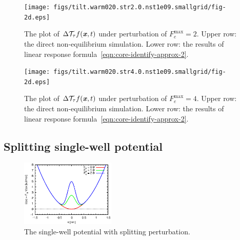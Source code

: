 \documentclass[aip,jcp,a4paper,reprint,onecolumn]{revtex4-1}
\newcommand{\vect}[1]{\textbf{\textit{#1}}}
\newcommand{\mt}{\mathcal T}
\begin{document}
\begin{figure}
  \centering
  \texttt{[image: figs/tilt.warm020.str2.0.nst1e09.smallgrid/fig-2d.eps]}
  \caption{The plot of $\Delta\mt_\tau f(\vect x,t)$  under perturbation of
    $F_e^{\textrm{max}} = 2$.
    Upper row: the direct non-equilibrium simulation. Lower row: the
    results of linear response formula~\eqref{eqn:core-identify-approx-2}.
  }
  \label{fig:tmp2}
\end{figure}

\begin{figure}
  \centering
  \texttt{[image: figs/tilt.warm020.str4.0.nst1e09.smallgrid/fig-2d.eps]}
  \caption{The plot of $\Delta\mt_\tau f(\vect x,t)$  under perturbation of
    $F_e^{\textrm{max}} = 4$.  Upper row: the direct non-equilibrium
    simulation. Lower row: the results of linear response
    formula~\eqref{eqn:core-identify-approx-2}.  }
  \label{fig:tmp3}
\end{figure}


\subsection{Splitting single-well potential}

\begin{figure}
  \centering
  \includegraphics[width=0.4\textwidth]{figs/fig-split-pot.eps}
  \caption{The single-well potential with splitting perturbation.}
  \label{fig:tmp4}
\end{figure}
\end{document}
